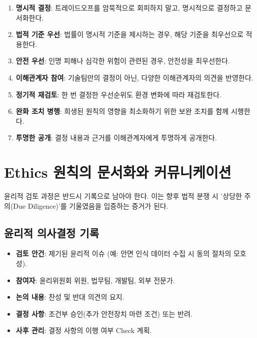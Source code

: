\begin{enumerate}
 \item \textbf{명시적 결정}: 
 트레이드오프를 암묵적으로 회피하지 말고, 명시적으로 결정하고 문서화한다.
 
 \item \textbf{법적 기준 우선}: 
 법률이 명시적 기준을 제시하는 경우, 해당 기준을 최우선으로 적용한다.
 
 \item \textbf{안전 우선}: 
 인명 피해나 심각한 위험이 관련된 경우, 안전성을 최우선한다.
 
 \item \textbf{이해관계자 참여}: 
 기술팀만의 결정이 아닌, 다양한 이해관계자의 의견을 반영한다.
 
 \item \textbf{정기적 재검토}: 
 한 번 결정한 우선순위도 환경 변화에 따라 재검토한다.
 
 \item \textbf{완화 조치 병행}: 
 희생된 원칙의 영향을 최소화하기 위한 보완 조치를 함께 시행한다.
 
 \item \textbf{투명한 공개}: 
 결정 내용과 근거를 이해관계자에게 투명하게 공개한다.
\end{enumerate}

\section{Ethics 원칙의 문서화와 커뮤니케이션}

윤리적 검토 과정은 반드시 기록으로 남아야 한다.\cite{madaio2020co} 이는 향후 법적 분쟁 시 '상당한 주의(Due Diligence)'를 기울였음을 입증하는 증거가 된다\cite{raji2020closing}.

\subsection{윤리적 의사결정 기록}
\begin{itemize}
 \item \textbf{검토 안건}: 제기된 윤리적 이슈 (예: 안면 인식 데이터 수집 시 동의 절차의 모호성).
 \item \textbf{참여자}: 윤리위원회 위원, 법무팀, 개발팀, 외부 전문가.
 \item \textbf{논의 내용}: 찬성 및 반대 의견의 요지.
 \item \textbf{결정 사항}: 조건부 승인(추가 안전장치 마련 조건) 또는 반려.
 \item \textbf{사후 관리}: 결정 사항의 이행 여부 Check 계획.
\end{itemize}


